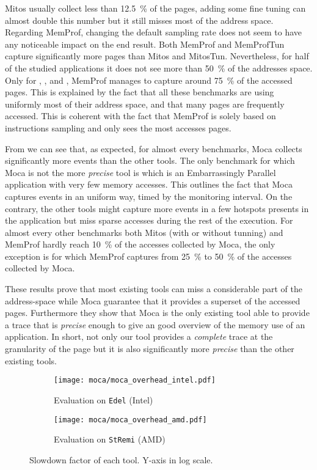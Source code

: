 \gls{Mitos} usually collect less than \SI{12.5}{\%} of the pages, adding some fine tuning can almost double this number but it still misses most of the address space.
Regarding \gls{MemProf}, changing the default sampling rate does not seem to have any noticeable impact on the end result.
Both \gls{MemProf} and MemProfTun capture significantly more pages than \gls{Mitos} and MitosTun.
Nevertheless, for half of the studied applications it does not see more than \SI{50}{\%} of the addresses space.
Only for \BT, \LU, \SP and \UA, \gls{MemProf} manages to capture around \SI{75}{\%} of the accessed pages.
This is explained by the fact that all these benchmarks are using uniformly most of their address space, and that many pages are frequently accessed.
This is coherent with the fact that \gls{MemProf} is solely based on instructions sampling and only sees the most accesses pages.

From  we can see that, as expected, for almost every benchmarks, \gls{Moca} collects significantly more events than the other tools.
 The only benchmark for which \gls{Moca} is not the more \emph{precise} tool is \EP which is an Embarrassingly Parallel application with very few memory accesses.
This outlines the fact that \gls{Moca} captures events in an uniform way, timed by the monitoring interval.
On the contrary, the other tools might capture more events in a few hotspots presents in the application but miss sparse accesses during the rest of the execution.
For almost every other benchmarks both \gls{Mitos} (with or without tunning) and \gls{MemProf} hardly reach \SI{10}{\%} of the accesses collected by \gls{Moca}, the only exception is \DC for which \gls{MemProf} captures from \SI{25}{\%} to \SI{50}{\%} of the accesses collected by \gls{Moca}.

These results prove that most existing tools can miss a considerable part of
the address-space while \gls{Moca} guarantee that it provides a superset of the accessed pages.
Furthermore they show that \gls{Moca} is the only existing tool able to provide a trace that is \emph{precise} enough to give an good overview of the memory use of an application.
In short, not only our tool provides a \emph{complete} trace at the granularity of the page but it is also significantly more \emph{precise} than the other existing tools.

\begin{figure}[htb]
    \centering
    \begin{subfigure}{.7\linewidth}
        \texttt{[image: moca/moca\_overhead\_intel.pdf]}
        \caption{Evaluation on \texttt{Edel} (Intel)}
        \label{fig:ovh-moca-Intel}
    \end{subfigure}
    \begin{subfigure}{.7\linewidth}
        \texttt{[image: moca/moca\_overhead\_amd.pdf]}
        \caption{Evaluation on \texttt{StRemi} (AMD)}
        \label{fig:ovh-moca-AMD}
    \end{subfigure}
    \caption[Slowdown factor of each tool.]{Slowdown factor of each tool.
    Y-axis in log scale.}
    \label{fig:ovh-moca}
\end{figure}

